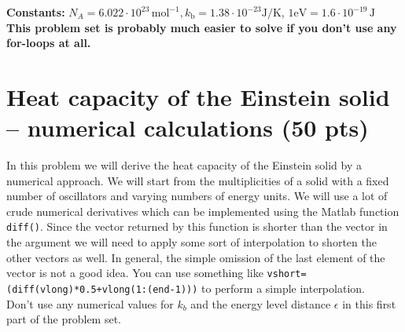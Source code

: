 \documentclass[11pt]{article}
\begin{document}
\newpage


\noindent\textbf{Constants:} $N_A=6{.}022\cdot10^{23}\,\mathrm{mol^{-1}}, k_\mathrm{b}=1{.}38\cdot10^{-23}\mathrm{J/K}$, $1\mathrm{eV}=1{.}6\cdot 10^{-19}\,\mathrm{J}$\\
\textbf{This problem set is probably much easier to solve if you don't use any for-loops at all.}

\section*{Heat capacity of the Einstein solid  -- numerical calculations (50 pts)}
\label{sec:lot}
In this problem we will derive the heat capacity of the Einstein solid by a numerical approach. We will start from the multiplicities of a solid with a fixed number of oscillators and varying numbers of energy units. We will use a lot of crude numerical derivatives which can be implemented using the Matlab function \verb|diff()|. Since the vector returned by this function is shorter than the vector in the argument we will need to apply some sort of interpolation to shorten the other vectors as well. In general, the simple omission of the last element of the vector is not a good idea. You can use something like \verb|vshort=(diff(vlong)*0.5+vlong(1:(end-1)))| to perform a simple interpolation.\\
Don't use any numerical values for $k_b$ and the energy level distance $\epsilon$ in this first part of the problem set.
\end{document}
